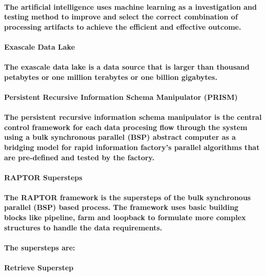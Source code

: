 \documentclass{acm_proc_article-sp}
\begin{document}
\paragraph{The artificial intelligence uses machine learning as a investigation and testing method to improve and select the correct combination of processing artifacts to achieve the efficient and effective outcome.}
\paragraph{\textbf{Exascale Data Lake}}
\paragraph{The exascale data lake is a data source that is larger than thousand petabytes or one million terabytes or one billion gigabytes.}
\paragraph{\textbf{Persistent Recursive Information Schema Manipulator (PRISM)}}
\paragraph{The persistent recursive information schema manipulator is the central control framework for each data procesing flow through the system using a bulk synchronous parallel (BSP) abstract computer as a bridging model for rapid information factory's parallel algorithms that are pre-defined and tested by the factory.}
\paragraph{\textbf{RAPTOR Supersteps}}
\paragraph{The RAPTOR framework is the supersteps of the bulk synchronous parallel (BSP) based process. The framework uses basic building blocks like pipeline, farm and loopback to formulate more complex structures to handle the data requirements.}
\paragraph{The supersteps are:}
\paragraph{\textbf{Retrieve Superstep}}
\end{document}
